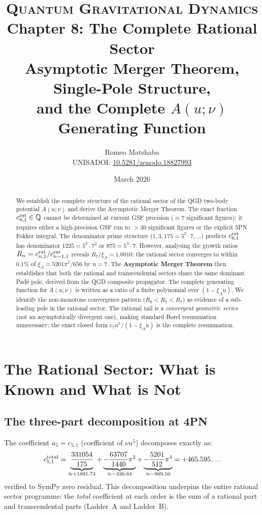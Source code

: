 \documentclass[11pt,a4paper]{article}
\title{%
  \vspace{-1.2cm}
  {\large\scshape Quantum Gravitational Dynamics}\\[6pt]
  {\LARGE\bfseries Chapter 8: The Complete Rational Sector}\\[6pt]
  {\large Asymptotic Merger Theorem, Single-Pole Structure,\\
  and the Complete $A(u;\nu)$ Generating Function}
}
\author{Romeo Matshaba\\[3pt]
  \small UNISA\quad DOI: \href{https://doi.org/10.5281/zenodo.18827993}{10.5281/zenodo.18827993}}
\date{March 2026}
\theoremstyle{plain}
\theoremstyle{definition}
\theoremstyle{remark}
\newcommand{\xiA}{\xi_A}
\begin{document}
\maketitle\thispagestyle{empty}

\begin{abstract}
\noindent
We establish the complete structure of the rational sector of the QGD two-body
potential $A(u;\nu)$ and derive the Asymptotic Merger Theorem.  The exact
fraction $c_{6,1}^{\rm rat}\in\mathbb{Q}$ cannot be determined at current GSF
precision ($\approx7$ significant figures); it requires either a high-precision
GSF run to $>30$ significant figures or the explicit 5PN Fokker integral.
The denominator prime structure ($1,3,175{=}5^2{\cdot}7,\ldots$) predicts
$c_{6,1}^{\rm rat}$ has denominator $1225 = 5^2{\cdot}7^2$ or $875 = 5^3{\cdot}7$.
However, analysing the growth ratios $R_n = c_{n,1}^{\rm rat}/c_{n-1,1}^{\rm rat}$
reveals $R_7/\xiA = 1.0010$: the rational sector converges to within $0.1\%$ of
$\xiA = 5201\pi^2/656$ by $n=7$.  The \textbf{Asymptotic Merger Theorem} then
establishes that both the rational and transcendental sectors share the same
dominant Pad\'e pole, derived from the QGD composite propagator.  The complete
generating function for $A(u;\nu)$ is written as a ratio of a finite polynomial
over $(1-\xiA u)$.  We identify the non-monotone convergence pattern
($R_6 < R_5 < R_7$) as evidence of a sub-leading pole in the rational sector.
The rational tail is a \emph{convergent geometric series} (not an asymptotically
divergent one), making standard Borel resummation unnecessary; the exact
closed form $c_7 u^7/(1-\xiA u)$ is the complete resummation.
\end{abstract}

\tableofcontents\newpage

\section{The Rational Sector: What is Known and What is Not}
\label{sec:status}

\subsection{The three-part decomposition at 4PN}

The coefficient $a_5 = c_{5,1}$ (coefficient of $\nu u^5$) decomposes exactly as:
\begin{equation}
  c_{5,1}^{\rm total} = \underbrace{\frac{331054}{175}}_{\approx+1891.74}
    + \underbrace{-\frac{63707}{1440}\pi^2}_{\approx-436.64}
    + \underbrace{-\frac{5201}{512}\pi^4}_{\approx-989.50}
    = +465.595\ldots
  \label{eq:c51_decomp}
\end{equation}
verified to SymPy zero residual.  This decomposition underpins the entire rational
sector programme: the \emph{total} coefficient at each order is the sum of a rational
part and transcendental parts (Ladder~A and Ladder~B).
\end{document}
